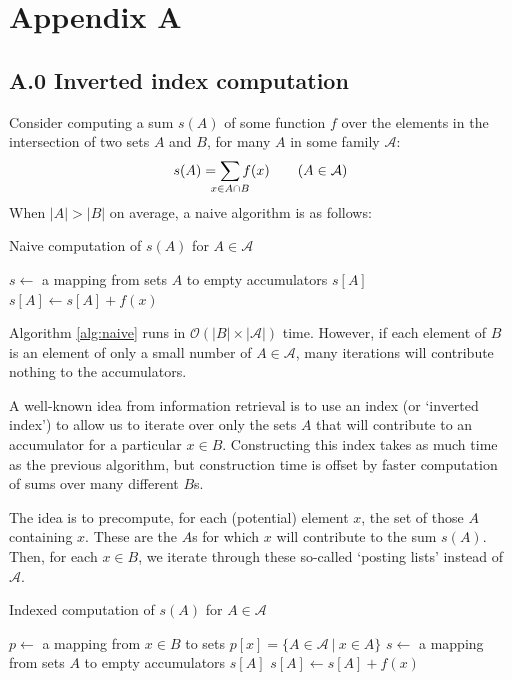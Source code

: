 \documentclass[twocolumn,10pt]{article}
\begin{document}
\section{Appendix A}

\subsection*{A.0 Inverted index computation}

Consider computing a sum $s(A)$ of some function $f$ over the elements
in the intersection of two sets $A$ and $B$, for many $A$ in some
family $\mathcal{A}$:
$$
s(A)
    = \smashoperator{\sum_{x \in A \cap B}} f(x)
\qquad (A \in \mathcal{A})
$$
When $|A| > |B|$ on average, a naive algorithm is as follows:
\begin{algorithm}
\caption{Naive computation of $s(A)$ for $A \in \mathcal{A}$}
\label{alg:naive}
\begin{algorithmic}
    \State $s \gets$ a mapping from sets $A$ to empty accumulators $s[A]$
                \State $s[A] \gets s[A] + f(x)$
            \EndIf
        \EndFor
    \EndFor
\end{algorithmic}
\end{algorithm}

Algorithm \ref{alg:naive} runs in $\mathcal{O}(|B|\times|\mathcal{A}|)$ time.
However, if each element of $B$ is an element of only a small number
of $A \in\mathcal{A}$, many iterations will contribute nothing to
the accumulators.

A well-known idea from information retrieval is to use an
index (or `inverted index') to allow us to iterate over only
the sets $A$ that will contribute to an accumulator for a particular
$x\in B$. Constructing this index takes as much time as the previous
algorithm, but construction time is offset by faster computation of
sums over many different $B$s.

The idea is to precompute, for each (potential) element $x$, the set
of those $A$ containing $x$. These are the $A$s for which $x$ will
contribute to the sum $s(A)$.
Then, for each $x\in B$, we iterate through these so-called `posting
lists' instead of $\mathcal{A}$.
\begin{algorithm}
\caption{Indexed computation of $s(A)$ for $A \in \mathcal{A}$}
\label{alg:index}
\begin{algorithmic}
    \State $p \gets$ a mapping from $x \in B$ to sets $p[x] = \{ A \in \mathcal{A} \ |\  x \in A \}$
    \State $s \gets$ a mapping from sets $A$ to empty accumulators $s[A]$
            \State $s[A] \gets s[A] + f(x)$
        \EndFor
    \EndFor
\end{algorithmic}
\end{algorithm}
\end{document}
